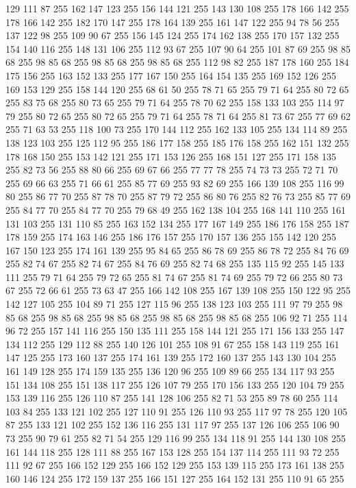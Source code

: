 129 111 87 255 162 147 123 255 156 144 121 255 143 130 108 255 178 166 142 255 178 166 142 255 182 170 147 255 178 164 139 255 161 147 122 255 94 78 56 255 137 122 98 255 109 90 67 255 156 145 124 255 174 162 138 255 170 157 132 255 154 140 116 255 148 131 106 255 112 93 67 255 107 90 64 255 101 87 69 255 98 85 68 255 98 85 68 255 98 85 68 255 98 85 68 255 112 98 82 255 187 178 160 255 184 175 156 255 163 152 133 255 177 167 150 255 164 154 135 255 169 152 126 255 169 153 129 255 158 144 120 255 68 61 50 255 78 71 65 255 79 71 64 255 80 72 65 255 83 75 68 255 80 73 65 255 79 71 64 255 78 70 62 255 158 133 103 255 114 97 79 255 80 72 65 255 80 72 65 255 79 71 64 255 78 71 64 255 81 73 67 255 77 69 62 255 71 63 53 255 118 100 73 255 170 144 112 255 162 133 105 255 134 114 89 255 138 123 103 255 125 112 95 255 186 177 158 255 185 176 158 255 162 151 132 255 178 168 150 255 153 142 121 255 171 153 126 255 168 151 127 255 171 158 135 255
82 73 56 255 88 80 66 255 69 67 66 255 77 77 78 255 74 73 73 255 72 71 70 255 69 66 63 255 71 66 61 255 85 77 69 255 93 82 69 255 166 139 108 255 116 99 80 255 86 77 70 255 87 78 70 255 87 79 72 255 86 80 76 255 82 76 73 255 85 77 69 255 84 77 70 255 84 77 70 255 79 68 49 255 162 138 104 255 168 141 110 255 161 131 103 255 131 110 85 255 163 152 134 255 177 167 149 255 186 176 158 255 187 178 159 255 174 163 146 255 186 176 157 255 170 157 136 255 155 142 120 255 167 150 123 255 174 161 139 255 95 84 65 255 86 78 69 255 86 78 72 255 84 76 69 255 82 74 67 255 82 74 67 255 84 76 69 255 82 74 68 255 135 115 92 255 145 133 111 255 79 71 64 255 79 72 65 255 81 74 67 255 81 74 69 255 79 72 66 255 80 73 67 255 72 66 61 255 73 63 47 255 166 142 108 255 167 139 108 255 150 122 95 255 142 127 105 255 104 89 71 255 127 115 96 255 138 123 103 255 111 97 79 255 98 85 68 255 98 85 68 255 98 85 68 255
98 85 68 255 98 85 68 255 106 92 71 255 114 96 72 255 157 141 116 255 150 135 111 255 158 144 121 255 171 156 133 255 147 134 112 255 129 112 88 255 140 126 101 255 108 91 67 255 158 143 119 255 161 147 125 255 173 160 137 255 174 161 139 255 172 160 137 255 143 130 104 255 161 149 128 255 174 159 135 255 136 120 96 255 109 89 66 255 134 117 93 255 151 134 108 255 151 138 117 255 126 107 79 255 170 156 133 255 120 104 79 255 153 139 116 255 126 110 87 255 141 128 106 255 82 71 53 255 89 78 60 255 114 103 84 255 133 121 102 255 127 110 91 255 126 110 93 255 117 97 78 255 120 105 87 255 133 121 102 255 152 136 116 255 131 117 97 255 137 126 106 255 106 90 73 255 90 79 61 255 82 71 54 255 129 116 99 255 134 118 91 255 144 130 108 255 161 144 118 255 128 111 88 255 167 153 128 255 154 137 114 255 111 93 72 255 111 92 67 255 166 152 129 255 166 152 129 255 153 139 115 255 173 161 138 255 160 146 124 255 172 159 137 255 166 151 127 255 164 152 131 255 110 91 65 255
